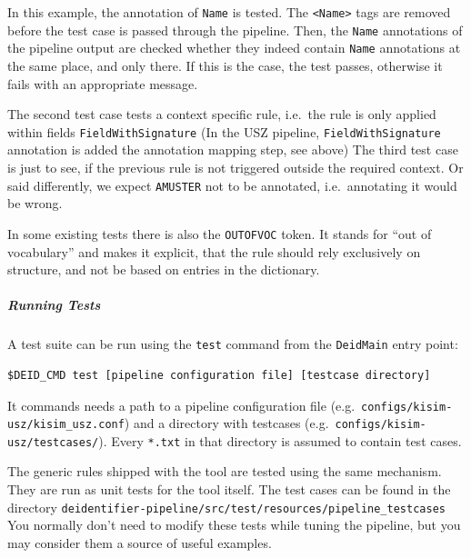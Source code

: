 In this example, the annotation of \texttt{Name} is tested. The
\texttt{\textless{}Name\textgreater{}} tags are removed before the test
case is passed through the pipeline. Then, the \texttt{Name} annotations
of the pipeline output are checked whether they indeed contain
\texttt{Name} annotations at the same place, and only there. If this is
the case, the test passes, otherwise it fails with an appropriate
message.

The second test case tests a context specific rule, i.e.~the rule is
only applied within fields \texttt{FieldWithSignature} (In the USZ
pipeline, \texttt{FieldWithSignature} annotation is added the annotation
mapping step, see above) The third test case is just to see, if the
previous rule is not triggered outside the required context. Or said
differently, we expect \texttt{AMUSTER} not to be annotated,
i.e.~annotating it would be wrong.

In some existing tests there is also the \texttt{OUTOFVOC} token. It
stands for ``out of vocabulary'' and makes it explicit, that the rule
should rely exclusively on structure, and not be based on entries in the
dictionary.

\subparagraph{Running Tests}\label{running-tests}

A test suite can be run using the \texttt{test} command from the
\texttt{DeidMain} entry point:

\begin{verbatim}
$DEID_CMD test [pipeline configuration file] [testcase directory]
\end{verbatim}

It commands needs a path to a pipeline configuration file
(e.g.~\texttt{configs/kisim-usz/kisim\_usz.conf}) and a directory with
testcases (e.g.~\texttt{configs/kisim-usz/testcases/}). Every
\texttt{*.txt} in that directory is assumed to contain test cases.

The generic rules shipped with the tool are tested using the same
mechanism. They are run as unit tests for the tool itself. The test
cases can be found in the directory
\texttt{deidentifier-pipeline/src/test/resources/pipeline\_testcases}
You normally don't need to modify these tests while tuning the pipeline,
but you may consider them a source of useful examples.
